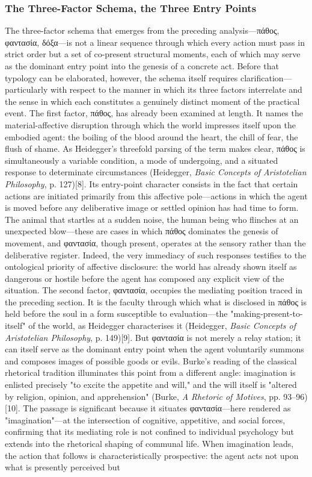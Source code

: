 \documentclass{article}
\begin{document}
\subsubsection*{The Three-Factor Schema, the Three Entry Points}

The three-factor schema that emerges from the preceding analysis—πάθος, φαντασία, δόξα—is not a linear sequence through which every action must pass in strict order but a set of co-present structural moments, each of which may serve as the dominant entry point into the genesis of a concrete act. Before that typology can be elaborated, however, the schema itself requires clarification—particularly with respect to the manner in which its three factors interrelate and the sense in which each constitutes a genuinely distinct moment of the practical event. The first factor, πάθος, has already been examined at length. It names the material-affective disruption through which the world impresses itself upon the embodied agent: the boiling of the blood around the heart, the chill of fear, the flush of shame. As Heidegger's threefold parsing of the term makes clear, πάθος is simultaneously a variable condition, a mode of undergoing, and a situated response to determinate circumstances (Heidegger, \textit{Basic Concepts of Aristotelian Philosophy}, p. 127)[8]. Its entry-point character consists in the fact that certain actions are initiated primarily from this affective pole—actions in which the agent is moved before any deliberative image or settled opinion has had time to form. The animal that startles at a sudden noise, the human being who flinches at an unexpected blow—these are cases in which πάθος dominates the genesis of movement, and φαντασία, though present, operates at the sensory rather than the deliberative register. Indeed, the very immediacy of such responses testifies to the ontological priority of affective disclosure: the world has already shown itself as dangerous or hostile before the agent has composed any explicit view of the situation. The second factor, φαντασία, occupies the mediating position traced in the preceding section. It is the faculty through which what is disclosed in πάθος is held before the soul in a form susceptible to evaluation—the "making-present-to-itself" of the world, as Heidegger characterises it (Heidegger, \textit{Basic Concepts of Aristotelian Philosophy}, p. 149)[9]. But φαντασία is not merely a relay station; it can itself serve as the dominant entry point when the agent voluntarily summons and composes images of possible goods or evils. Burke's reading of the classical rhetorical tradition illuminates this point from a different angle: imagination is enlisted precisely "to excite the appetite and will," and the will itself is "altered by religion, opinion, and apprehension" (Burke, \textit{A Rhetoric of Motives}, pp. 93–96)[10]. The passage is significant because it situates φαντασία—here rendered as "imagination"—at the intersection of cognitive, appetitive, and social forces, confirming that its mediating role is not confined to individual psychology but extends into the rhetorical shaping of communal life. When imagination leads, the action that follows is characteristically prospective: the agent acts not upon what is presently perceived but 
\end{document}
